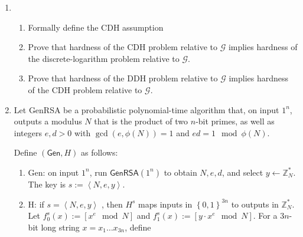 \documentclass{article}
\begin{document}
\begin{enumerate}
\begin{enumerate}
        \begin{proof}
          Let $p, q \in \mathbb{Z}$ such that $p, q$ are distinct primes. $N =
          pq$. Let $e, d \in \mathbb{Z}$ such that $ed \equiv 1 \pmod{\phi(N)}$.
          Consider $\phi(N)$.

          Since $N$ is composite, $\phi(N) = (p - 1)(q - 1)$.

          Since $ed \equiv 1 \pmod{\phi(N)}$, $ed \equiv \pmod{(p - 1)(q - 1)}$,
          so $ed \equiv 1 + (p - 1)(q - 1)k$, for some $k \in \mathbb{Z}$.

          Now consider, $x^{ed}$. $x^{ed} = x^{(p - 1)(q - 1) + 1} = x^{(p -
            1)}x^{(q - 1)}x$

          Now, since $p - 1$ and $q - 1$ are inverses ($\mod (p - 1)(q - 1)$),
          $x^{p - 1}x^{q - 1}x = 1 * 1 * x = x$.

          So, $x^{ed} = x$.
         \end{proof}

      \item If $N = pq$ and $ed = 1 \mod \phi(N)$ then for all $x \in Z_N$ we
        have $(x^e)^d = x \mod N$.
    \end{enumerate}
  \item 
    \begin{enumerate}
      \item Formally define the CDH assumption
      \item Prove that hardness of the CDH problem relative to $\mathcal{G}$ implies
        hardness of the discrete-logarithm problem relative to $\mathcal{G}$.
      \item Prove that hardness of the DDH problem relative to $\mathcal{G}$
        implies hardness of the CDH problem relative to $\mathcal{G}$.
    \end{enumerate}
  \item Let \textsf{GenRSA} be a probabilistic polynomial-time algorithm that,
    on input $1^n$, outputs a modulus $N$ that is the product of two $n$-bit 
    primes, as well as integers $e, d > 0$ with $\gcd(e, \phi(N)) = 1$ and 
    $ed = 1 \mod \phi(N)$.

    Define $(\textsf{Gen}, H)$ as follows:

    \begin{enumerate}
      \item \textsf{Gen}: on input $1^n$, run $\textsf{GenRSA}(1^n)$ to obtain
        $N, e, d$, and select $y \leftarrow \mathbb{Z}^{*}_N$. The key is $s := \left<N, e,
        y\right>$.
      \item \textsf{H}: if $s = \left<N, e, y\right>$ , then $H^s$ maps inputs
        in $\left\{0, 1\right\}^{3n}$ to outputs in $\mathbb{Z}^{*}_N$. Let $f_0^s(x) :=
        [x^e \mod N]$ and $f_1^s(x) := [y \cdot x^e \mod N]$. For a $3n$-bit long
        string $x = x_1 \dots x_{3n}$, define


\end{enumerate}
\end{enumerate}
\end{document}
